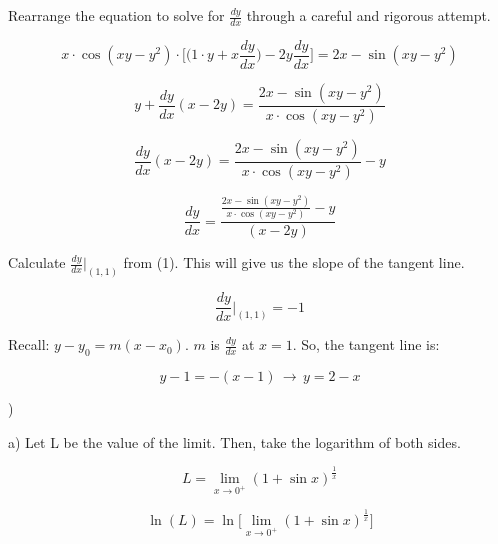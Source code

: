 \documentclass{article}
\begin{document}
\noindent Rearrange the equation to solve for $\frac{dy}{dx}$ through a careful and rigorous attempt.

\begin{equation*} x\cdot\cos(xy-y^2) \cdot \Big[\Big(1\cdot y + x\frac{dy}{dx} \Big) -2y\frac{dy}{dx}\Big]= 2x - \sin(xy-y^2)\end{equation*}

\begin{equation*} y + \frac{dy}{dx}(x-2y)= \frac{2x - \sin(xy-y^2)}{x\cdot\cos(xy-y^2)}\end{equation*}

\begin{equation*} \frac{dy}{dx}(x-2y)= \frac{2x - \sin(xy-y^2)}{x\cdot\cos(xy-y^2)} - y\end{equation*}

\hfill

\begin{equation} \frac{dy}{dx} = \frac{\frac{2x - \sin(xy-y^2)}{x\cdot\cos(xy-y^2)} - y}{(x-2y)}\end{equation}

\hfill

\noindent Calculate $\displaystyle \frac{dy}{dx}\Bigg|_{(1,1)}$ from (1). This will give us the slope of the tangent line.

\begin{equation*}\frac{dy}{dx}\Bigg|_{(1,1)} = -1\end{equation*}

\hfill

\noindent Recall: $y-y_0 = m(x-x_0)$. $m$ is $\displaystyle \frac{dy}{dx}$ at $x=1$. So, the tangent line is:

\begin{equation*} y-1 = -(x-1) \,\rightarrow\, \boxed{y=2-x}\end{equation*}

\hfill

)

\hfill

\noindent a) Let L be the value of the limit. Then, take the logarithm of both sides.

\begin{equation*}L = \lim_{x\to 0^+} (1+\sin x)^{\frac{1}{x}}\end{equation*}

\begin{equation*}\ln(L) = \ln\Big[\lim_{x\to 0^+} (1+\sin x)^{\frac{1}{x}}\Big]\end{equation*}
\end{document}
